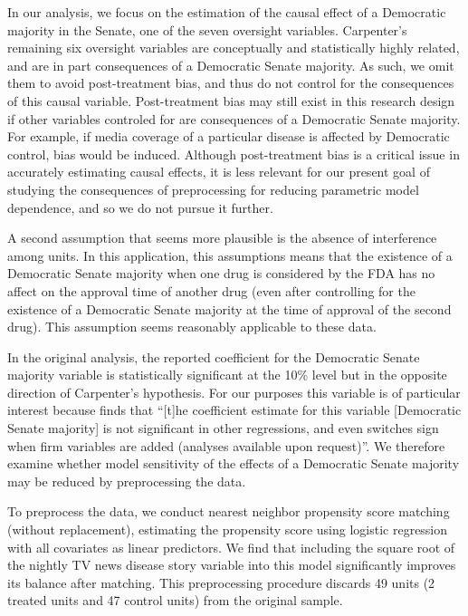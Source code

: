 \documentclass[11pt,titlepage]{article}
\begin{document}
In our analysis, we focus on the estimation of the causal effect of a
Democratic majority in the Senate, one of the seven oversight
variables.  Carpenter's remaining six oversight variables are
conceptually and statistically highly related, and are in part
consequences of a Democratic Senate majority.  As such, we omit them
to avoid post-treatment bias, and thus do not control for the
consequences of this causal variable.  Post-treatment bias may still
exist in this research design if other variables controled for are
consequences of a Democratic Senate majority.  For example, if media
coverage of a particular disease is affected by Democratic control,
bias would be induced.  Although post-treatment bias is a critical
issue in accurately estimating causal effects, it is less relevant for
our present goal of studying the consequences of preprocessing for
reducing parametric model dependence, and so we do not pursue it
further.  

A second assumption that seems more plausible is the absence of
interference among units.  In this application, this assumptions means
that the existence of a Democratic Senate majority when one drug is
considered by the FDA has no affect on the approval time of another
drug (even after controlling for the existence of a Democratic Senate
majority at the time of approval of the second drug).  This assumption
seems reasonably applicable to these data.

In the original analysis, the reported coefficient for the Democratic
Senate majority variable is statistically significant at the 10\%
level but in the opposite direction of Carpenter's hypothesis.  For
our purposes this variable is of particular interest because
\citet[p.498]{Carp02} finds that ``[t]he coefficient estimate for this
variable [Democratic Senate majority] is not significant in other
regressions, and even switches sign when firm variables are added
(analyses available upon request)''.  We therefore examine whether
model sensitivity of the effects of a Democratic Senate majority may
be reduced by preprocessing the data.

To preprocess the data, we conduct nearest neighbor propensity score
matching (without replacement), estimating the propensity score using
logistic regression with all covariates as linear predictors. We find
that including the square root of the nightly TV news disease story
variable into this model significantly improves its balance after
matching. This preprocessing procedure discards 49 units (2 treated
units and 47 control units) from the original sample.
\end{document}
